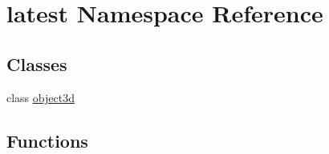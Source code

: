 \hypertarget{namespacelatest}{}\section{latest Namespace Reference}
\label{namespacelatest}
\subsection*{Classes}
\begin{DoxyCompactItemize}
\item 
class \hyperlink{classlatest_1_1object3d}{object3d}
\end{DoxyCompactItemize}
\subsection*{Functions}
